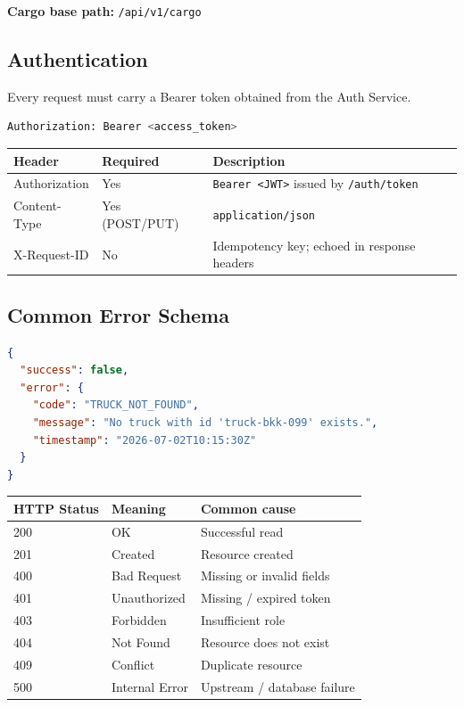 \documentclass{article}
\begin{document}
\textbf{Cargo base path:} \texttt{/api/v1/cargo}

\subsection{Authentication}

Every request must carry a Bearer token obtained from the Auth Service.

\begin{lstlisting}[language=bash, caption=Authorization header]
Authorization: Bearer <access_token>
\end{lstlisting}

\begin{center}
\begin{tabular}{>{\ttfamily}lll}
\toprule
\textbf{Header} & \textbf{Required} & \textbf{Description}\\
\midrule
Authorization & Yes & \texttt{Bearer <JWT>} issued by \texttt{/auth/token}\\
Content-Type  & Yes (POST/PUT) & \texttt{application/json}\\
X-Request-ID  & No  & Idempotency key; echoed in response headers\\
\bottomrule
\end{tabular}
\end{center}

\subsection{Common Error Schema}

\begin{lstlisting}[language=json, caption=Error response envelope]
{
  "success": false,
  "error": {
    "code": "TRUCK_NOT_FOUND",
    "message": "No truck with id 'truck-bkk-099' exists.",
    "timestamp": "2026-07-02T10:15:30Z"
  }
}
\end{lstlisting}

\begin{center}
\begin{tabular}{lll}
\toprule
\textbf{HTTP Status} & \textbf{Meaning} & \textbf{Common cause}\\
\midrule
200 & OK & Successful read\\
201 & Created & Resource created\\
400 & Bad Request & Missing or invalid fields\\
401 & Unauthorized & Missing / expired token\\
403 & Forbidden & Insufficient role\\
404 & Not Found & Resource does not exist\\
409 & Conflict & Duplicate resource\\
500 & Internal Error & Upstream / database failure\\
\bottomrule
\end{tabular}
\end{center}
\end{document}
